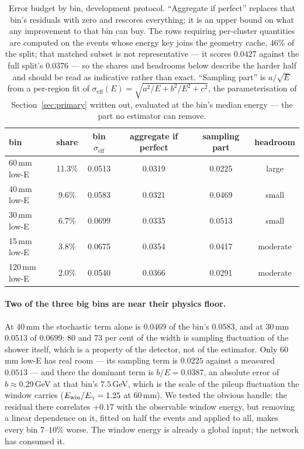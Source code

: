 \documentclass[11pt,a4paper]{article}
\newcommand{\seff}{\ensuremath{\sigma_{\mathrm{eff}}}}
\begin{document}
\begin{table}[h]
\centering
\caption{Error budget by bin, development protocol. ``Aggregate if perfect''
replaces that bin's residuals with zero and rescores everything; it is an upper
bound on what any improvement to that bin can buy. The rows requiring
per-cluster quantities are computed on the events whose energy key joins the
geometry cache, $46\%$ of the split; that matched subset is not
representative --- it scores $0.0427$ against the full split's $0.0376$ ---
so the shares and headrooms below describe the harder half and should be
read as indicative rather than exact. ``Sampling part'' is
$a/\sqrt{E}$ from a per-region fit of
$\seff(E) = \sqrt{a^2/E + b^2/E^2 + c^2}$, the parameterisation of
Section~\ref{sec:primary} written out, evaluated at the bin's median
energy --- the part no estimator can remove.}
\label{tab:budget}
\begin{tabular}{lccccc}
\toprule
bin & share & bin \seff{} & aggregate if perfect & sampling part & headroom\\
\midrule
60\,mm low-E & 11.3\% & 0.0513 & 0.0319 & 0.0225 & large\\
40\,mm low-E & 9.6\% & 0.0583 & 0.0321 & 0.0469 & small\\
30\,mm low-E & 6.7\% & 0.0699 & 0.0335 & 0.0513 & small\\
15\,mm low-E & 3.8\% & 0.0675 & 0.0354 & 0.0417 & moderate\\
120\,mm low-E & 2.0\% & 0.0540 & 0.0366 & 0.0291 & moderate\\
\bottomrule
\end{tabular}
\end{table}

\paragraph{Two of the three big bins are near their physics floor.} At 40\,mm
the stochastic term alone is $0.0469$ of the bin's $0.0583$, and at 30\,mm
$0.0513$ of $0.0699$: $80$ and $73$ per cent of the width is sampling
fluctuation of the shower itself, which is a property of the detector, not of
the estimator. Only 60\,mm low-E has real room --- its sampling term is
$0.0225$ against a measured $0.0513$ --- and there the dominant term is
$b/E = 0.0387$, an absolute error of $b \approx 0.29$\,GeV at that bin's
$7.5$\,GeV, which is the scale of the pileup fluctuation the window carries
($E_{\rm win}/E_\gamma = 1.25$ at 60\,mm). We tested the obvious handle: the
residual there correlates $+0.17$ with the observable window energy, but
removing a linear dependence on it, fitted on half the events and applied to
all, makes every bin $7$--$10\%$ worse. The window energy is already a global
input; the network has consumed it.
\end{document}
